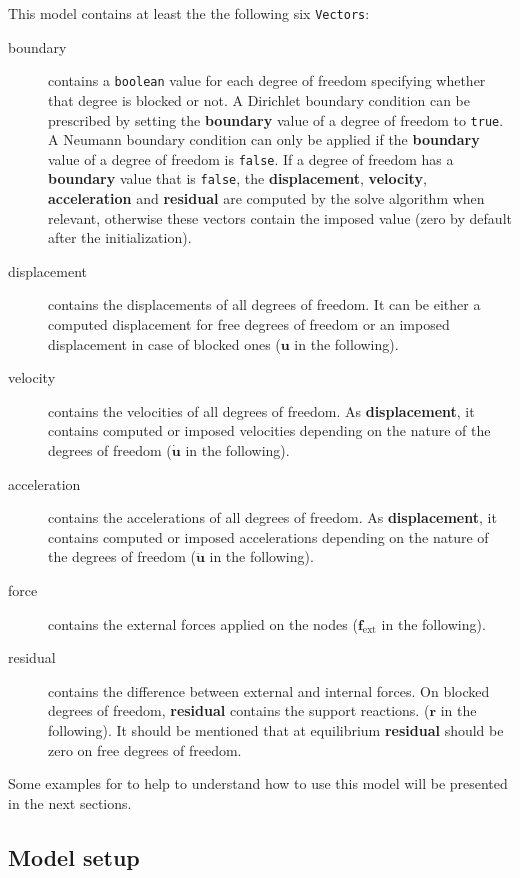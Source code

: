 \documentclass[a4paper,11pt]{book}
\newcommand{\code}[1]{\texttt{#1}}
\renewcommand{\vec}[1]{\ensuremath{\boldsymbol{#1}}}
\newcommand{\st}[1]{{\mathrm{#1}}}
\begin{document}
This model contains at least the the following six \code{Vectors}:
\begin{description}
\item[boundary]  contains a  \code{boolean}  value for  each  degree of  freedom
  specifying  whether  that degree  is  blocked  or  not. A  Dirichlet  boundary
  condition can be prescribed by setting the \textbf{boundary} value of a degree
  of freedom to  \code{true}.  A Neumann boundary condition  can only be applied
  if the  \textbf{boundary} value of a  degree of freedom is  \code{false}. If a
  degree  of freedom  has a  \textbf{boundary} value  that is  \code{false}, the
  \textbf{displacement},     \textbf{velocity},     \textbf{acceleration}    and
  \textbf{residual} are computed by the solve algorithm when relevant, otherwise
  these  vectors  contain   the  imposed  value  (zero  by   default  after  the
  initialization).
\item[displacement] contains the displacements of all degrees of freedom. It can
  be either  a computed displacement for  free degrees of freedom  or an imposed
  displacement in case of blocked ones ($\vec{u}$ in the following).
\item[velocity]  contains  the  velocities   of  all  degrees  of  freedom.   As
  \textbf{displacement}, it contains computed or imposed velocities depending on
  the nature of the degrees of freedom ($\vec{\dot{u}}$ in the following).
\item[acceleration]  contains the accelerations  of all  degrees of  freedom. As
  \textbf{displacement}, it contains computed or imposed accelerations depending
  on the nature of the degrees of freedom ($\vec{\ddot{u}}$ in the following).
\item[force]   contains    the   external   forces   applied    on   the   nodes
  ($\vec{f_{\st{ext}}}$ in the following).
\item[residual] contains the difference between external and internal forces. On
  blocked degrees of freedom,  \textbf{residual} contains the support reactions.
  ($\vec{r}$  in the  following).  It  should be  mentioned that  at equilibrium
  \textbf{residual} should be zero on free degrees of freedom.
\end{description}

Some examples for to help to understand  how to use this model will be presented
in the next sections.

\subsection{Model setup}
\end{document}
